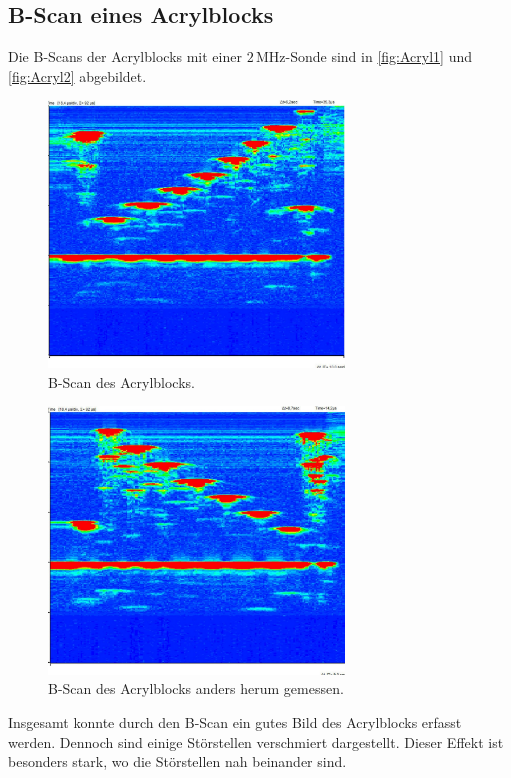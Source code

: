 \subsection{B-Scan eines Acrylblocks}
Die B-Scans der Acrylblocks mit einer $2\,\unit{\mega\hertz}$-Sonde sind in \autoref{fig:Acryl1} und
\autoref{fig:Acryl2} abgebildet.
\begin{figure}
  \centering
  \includegraphics[width=0.7\textwidth]{messwerte/BScanAcrylBlock/2Mhz.jpg}
  \caption{B-Scan des Acrylblocks.}
  \label{fig:Acryl1}
\end{figure}

\begin{figure}
  \centering
  \includegraphics[width=0.7\textwidth]{messwerte/BScanAcrylBlock/umgedreht.jpg}
  \caption{B-Scan des Acrylblocks anders herum gemessen.}
  \label{fig:Acryl2}
\end{figure}
Insgesamt konnte durch den B-Scan ein gutes Bild des Acrylblocks erfasst werden. Dennoch sind einige Störstellen
verschmiert dargestellt. Dieser Effekt ist besonders stark, wo die Störstellen nah beinander sind.

